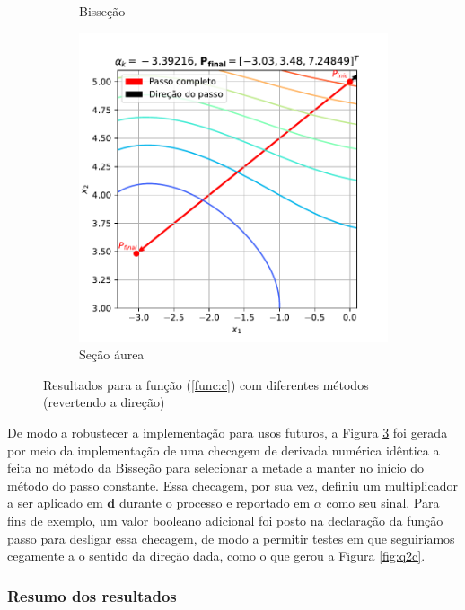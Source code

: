 \documentclass[10pt, a4paper]{article}
\begin{document}
\begin{figure}[htpb]
\begin{subfigure}[b]{0.32\textwidth}
      \caption{Bisseção}
      \label{fig:q2c2_2}
  \end{subfigure}
  \hfill
  \begin{subfigure}[b]{0.32\textwidth}
      \centering
      \includegraphics[width=\textwidth]{images/q2c2_3.pdf}
      \caption{Seção áurea}
      \label{fig:q2c2_3}
  \end{subfigure}
     \caption{Resultados para a função (\ref{func:c}) com diferentes métodos (revertendo a direção)}
     \label{fig:q2c2}
\end{figure}

De modo a robustecer a implementação para usos futuros, a Figura \ref{fig:q2c2} foi gerada por meio
da implementação de uma checagem de derivada numérica idêntica a feita no método da Bisseção para 
selecionar a metade a manter no início do método do passo constante. Essa checagem, por sua vez, definiu
um multiplicador a ser aplicado em $\mathbf{d}$ durante o processo e reportado em $\alpha$ como 
seu sinal. Para fins de exemplo, um valor booleano adicional foi posto na declaração da função passo
para desligar essa checagem, de modo a permitir testes em que seguiríamos cegamente a o sentido da direção dada,
como o que gerou a Figura \ref{fig:q2c}.

\subsubsection{Resumo dos resultados}
\end{document}
